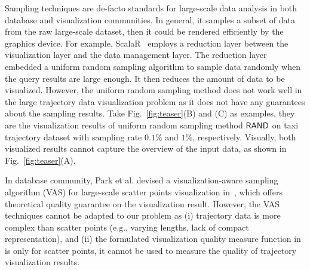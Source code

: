 {Sampling techniques are de-facto standards} for large-scale data analysis in both database and visualization communities.
In general, it samples a subset of data from the raw large-scale dataset, then it could be rendered efficiently by the graphics device.
For example, ScalaR~\cite{battle2013dynamic} employs a reduction layer between the visualization layer and the data management layer.
The reduction layer embedded a uniform random sampling algorithm to sample data randomly when the query results are large enough.
It then reduces the amount of data to be visualized.
However, the uniform random sampling method does not work well in the large trajectory data visualization problem as it does not have any guarantees about the sampling results.
Take Fig.~\ref{fig:teaser}(B) and (C) as examples,
they are the visualization results of uniform random sampling method $\mathsf{RAND}$ on \pt{} taxi trajectory dataset with sampling rate $0.1\%$ and $1\%$, respectively.
Visually, both visualized results cannot capture the overview of the input data, as shown in Fig.~\ref{fig:teaser}(A).

In database community,  Park et al. devised a visualization-aware sampling algorithm (VAS) for large-scale scatter points visualization  in~\cite{park2016visualization},
which offers theoretical quality guarantee on the visualization result.
However, the VAS techniques cannot be adapted to our problem as  (i) trajectory data is  more complex than scatter points (e.g., varying lengths, lack of compact representation),
and  (ii) the formulated visualization quality measure function in~\cite{park2016visualization} is only for scatter points, it cannot be used to measure the quality of trajectory visualization results.

